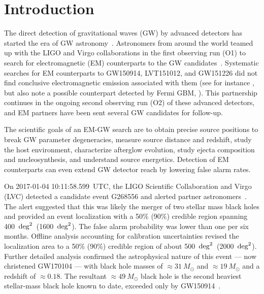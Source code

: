 \documentclass[twocolumn]{aastex6}
\newcommand{\sqd}{\ensuremath{{\rm deg}^2}}
\begin{document}
\section{Introduction}
The direct detection of gravitational waves (GW) by advanced detectors has started the era of GW astronomy~\citep{lsc16}. Astronomers from around the world teamed up with the LIGO and Virgo collaborations in the first observing run (O1) to search for electromagnetic (EM) counterparts to the GW candidates~\citep{aaa+16,aaa+16b}. 
Systematic searches for EM counterparts to GW150914, LVT151012, and  GW151226 did not find conclusive electromagnetic emission associated with them (see for instance \citealt{kcs+16,pck+16,bbv+16b,2016ApJ...820L..36S,2016ApJ...823L...2A,2016ApJ...823L..33S,2016ApJ...823L..34A,2016ApJ...825L...4T,2016MNRAS.460L..40E,2016MNRAS.462.4094S,2016PASJ...68L...9M,2016ApJ...826L..29C,2016ApJ...827L..40S,2016ApJ...829L..20A,2016ApJ...830L..11A,2016PhRvD..94l2007A,2017ApJ...835...82R,2017arXiv170306298A}, but also note a possible counterpart detected by Fermi GBM, \citealt{2016ApJ...826L...6C}).
This partnership continues in the ongoing second observing run (O2) of these advanced detectors, and EM partners have been sent several GW candidates for follow-up.

The scientific goals of an EM-GW search are to obtain precise source positions to break GW parameter degeneracies, measure source distance and redshift, study the host environment, characterize afterglow evolution, study ejecta composition and nucleosynthesis, and understand source energetics. Detection of EM counterparts can even extend GW detector reach by lowering false alarm rates.

On 2017-01-04 10:11:58.599~UTC, the LIGO Scientific Collaboration and Virgo (LVC) detected a candidate event G268556 and alerted partner astronomers~\citep{GW170104_detect}. The alert suggested that this was likely
the merger of two stellar mass black holes and provided an event localization with a 50\% (90\%) credible region spanning 400~\sqd\ (1600~\sqd). The false alarm probability was lower than one per six months. Offline analysis accounting for calibration uncertainties revised the localization area to a 50\% (90\%) credible region of about 500~\sqd\ (2000~\sqd). Further detailed analysis confirmed the astrophysical nature of this event --- now christened GW170104 --- with black hole masses of $\approx31~M_\odot$ and $\approx19~M_\odot$ and a redshift of $\approx 0.18$. The resultant $\approx49~M_\odot$ black hole is the second heaviest stellar-mass black hole known to date, exceeded only by GW150914~\citep{GW170104_main}.
\end{document}
